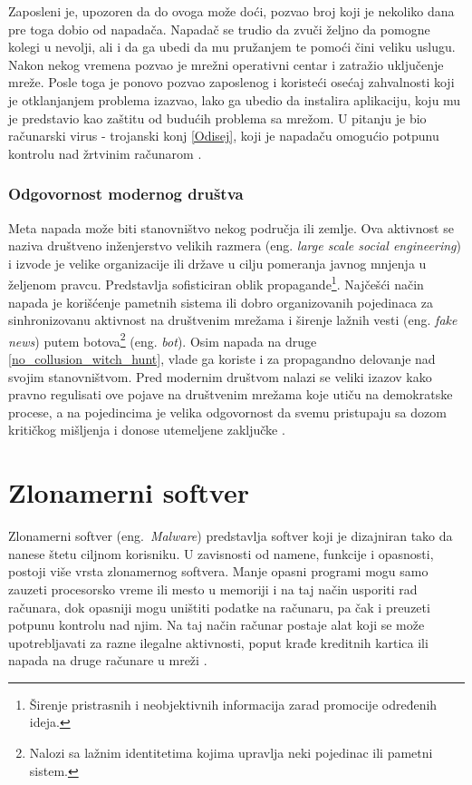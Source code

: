 \documentclass[a4paper]{article}
\begin{document}
Zaposleni je, upozoren da do ovoga može doći, pozvao broj koji je nekoliko dana pre toga dobio od napadača. Napadač se trudio da zvuči željno da pomogne kolegi u nevolji, ali i da ga ubedi da mu pružanjem te pomoći čini veliku uslugu. Nakon nekog vremena pozvao je mrežni operativni centar i zatražio uključenje mreže. Posle toga je ponovo pozvao zaposlenog i koristeći osećaj zahvalnosti koji je otklanjanjem problema izazvao, lako ga ubedio da instalira aplikaciju, koju mu je predstavio kao zaštitu od budućih problema sa mrežom. U pitanju je bio računarski virus - trojanski konj \ref{Odisej}, koji je napadaču omogućio potpunu kontrolu nad žrtvinim računarom \cite{deception}.

\subsubsection{Odgovornost modernog društva}

Meta napada može biti stanovništvo nekog područja ili zemlje. Ova aktivnost se naziva društveno inženjerstvo velikih razmera (eng. \textit{large scale social engineering}) i izvode je velike organizacije ili države u cilju pomeranja javnog mnjenja u željenom pravcu. Predstavlja sofisticiran oblik propagande\footnote{Širenje pristrasnih i neobjektivnih informacija zarad promocije određenih ideja.}. Najčešći način napada je korišćenje pametnih sistema ili dobro organizovanih pojedinaca za sinhronizovanu aktivnost na društvenim mrežama i širenje lažnih vesti (eng. \textit{fake news}) putem botova\footnote{Nalozi sa lažnim identitetima kojima upravlja neki pojedinac ili pametni sistem.} (eng. \textit{bot}). Osim napada na druge \ref{no_collusion_witch_hunt}, vlade ga koriste i za propagandno delovanje nad svojim stanovništvom. Pred modernim društvom nalazi se veliki izazov kako pravno regulisati ove pojave na društvenim mrežama koje utiču na demokratske procese, a na pojedincima je velika odgovornost da svemu pristupaju sa dozom kritičkog mišljenja i donose utemeljene zaključke \cite{fake_news}.


\section{Zlonamerni softver}
\label{sec:malware}

Zlonamerni softver (eng.~{\em Malware}) predstavlja softver koji je dizajniran tako da nanese štetu ciljnom korisniku. U zavisnosti od namene, funkcije i opasnosti, postoji više vrsta zlonamernog softvera. Manje opasni programi mogu samo zauzeti procesorsko vreme ili mesto u memoriji i na taj način usporiti rad računara, dok opasniji mogu uništiti podatke na računaru, pa čak i preuzeti potpunu kontrolu nad njim. Na taj način računar postaje alat koji se može upotrebljavati za razne ilegalne aktivnosti, poput krađe kreditnih kartica ili napada na druge računare u mreži \cite{ethics}.
\end{document}
